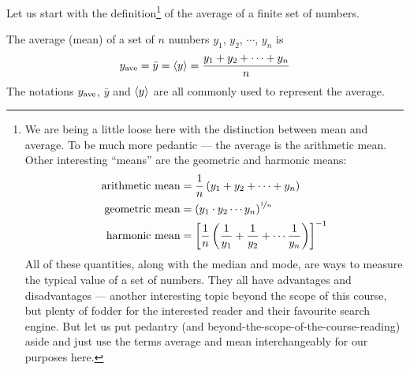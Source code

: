 Let us start with the definition\footnote{
We are being a little loose here with the distinction between mean and average. To be
much more pedantic --- the average is the arithmetic mean. Other interesting ``means'' are
the geometric and harmonic means:
\begin{align*}
  \text{arithmetic mean} &= \frac{1}{n}\left( y_1 + y_2 + \cdots + y_n \right)\\
  \text{geometric mean} &= \left( y_1 \cdot y_2 \cdots y_n \right)^{\nicefrac{1}{n}}\\
  \text{harmonic mean} &= \left[\frac{1}{n}\left(
  \frac{1}{y_1} + \frac{1}{y_2} + \cdots \frac{1}{y_n}
  \right)\right]^{-1}
\end{align*}
All of these quantities, along with the median and mode, are ways to measure the typical
value of a set of numbers. They all have advantages and disadvantages --- another
interesting topic beyond the scope of this course, but plenty of fodder for the
interested reader and their favourite search engine. But let us put pedantry (and
beyond-the-scope-of-the-course-reading) aside and just use the terms average and mean
interchangeably for our purposes here.} of the average of a finite set of numbers.
\begin{defn}\label{def avg}
 The average (mean) of a set of $n$ numbers $y_1$, $y_2$, $\cdots$, $y_n$ is
\begin{align*}
y_{\mathrm{ave}} =\bar y = \left< y\right> =\frac{y_1+y_2+\cdots+y_n}{n}
\end{align*}
The notations $y_{\mathrm{ave}}$, $\bar y$ and $\left< y\right>$ are all commonly used
to represent the average.
\end{defn}

